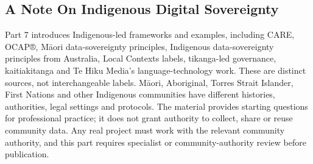 \documentclass[11pt,openany]{book}
\begin{document}
\subsection{A Note On Indigenous Digital Sovereignty}


Part 7 introduces Indigenous-led frameworks and examples, including CARE, OCAP®, Māori data-sovereignty principles, Indigenous data-sovereignty principles from Australia, Local Contexts labels, tikanga-led governance, kaitiakitanga and Te Hiku Media's language-technology work. These are distinct sources, not interchangeable labels. Māori, Aboriginal, Torres Strait Islander, First Nations and other Indigenous communities have different histories, authorities, legal settings and protocols. The material provides starting questions for professional practice; it does not grant authority to collect, share or reuse community data. Any real project must work with the relevant community authority, and this part requires specialist or community-authority review before publication.
\setcounter{secnumdepth}{2}

\tableofcontents
\mainmatter








\backmatter
\cleardoublepage
{}
{}
\printbibliography[title={References}]
\cleardoublepage
{}
{}
{\footnotesize\raggedright\printindex}
\end{document}

